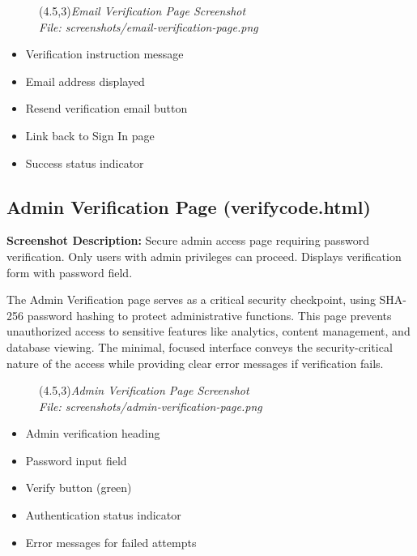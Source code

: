 \documentclass[a4paper,12pt]{article}
\begin{document}
\begin{figure}[h]
    \centering
    \framebox(4.5,3){\textit{Email Verification Page Screenshot}}\\
    \small\textit{File: screenshots/email-verification-page.png}
\end{figure}

\begin{itemize}
    \item Verification instruction message
    \item Email address displayed
    \item Resend verification email button
    \item Link back to Sign In page
    \item Success status indicator
\end{itemize}

\subsection{Admin Verification Page (verifycode.html)}
\textbf{Screenshot Description:} Secure admin access page requiring password verification. Only users with admin privileges can proceed. Displays verification form with password field.

The Admin Verification page serves as a critical security checkpoint, using SHA-256 password hashing to protect administrative functions. This page prevents unauthorized access to sensitive features like analytics, content management, and database viewing. The minimal, focused interface conveys the security-critical nature of the access while providing clear error messages if verification fails.

\begin{figure}[h]
    \centering
    \framebox(4.5,3){\textit{Admin Verification Page Screenshot}}\\
    \small\textit{File: screenshots/admin-verification-page.png}
\end{figure}

\begin{itemize}
    \item Admin verification heading
    \item Password input field
    \item Verify button (green)
    \item Authentication status indicator
    \item Error messages for failed attempts
\end{itemize}
\end{document}
